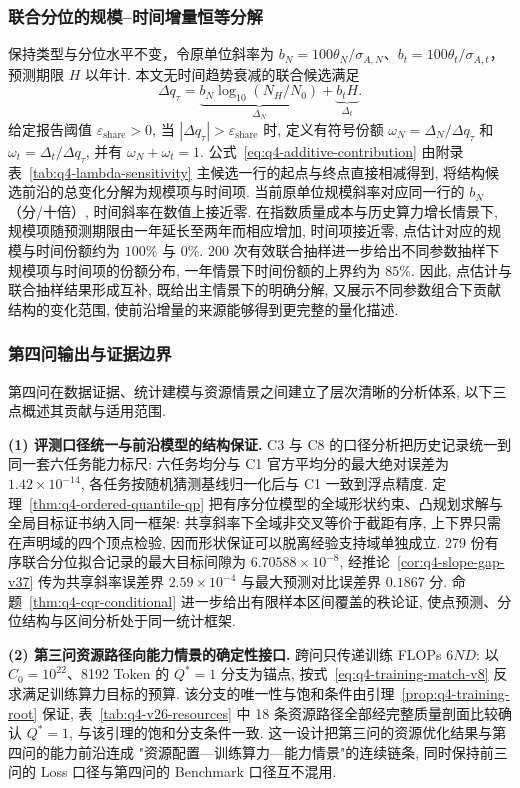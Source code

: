 \subsubsection{联合分位的规模--时间增量恒等分解}
保持类型与分位水平不变，令原单位斜率为 $b_N=100\theta_N/\sigma_{A,N}$、$b_t=100\theta_t/\sigma_{A,t}$，预测期限 $H$ 以年计. 本文无时间趋势衰减的联合候选满足
\begin{equation}\label{eq:q4-additive-contribution}
\Delta q_\tau=
\underbrace{b_N\log_{10}(N_H/N_0)}_{\Delta_N}
+\underbrace{b_tH}_{\Delta_t}.
\end{equation}
给定报告阈值 $\varepsilon_{\mathrm{share}}>0$, 当 $|\Delta q_\tau|>\varepsilon_{\mathrm{share}}$ 时, 定义有符号份额 $\omega_N=\Delta_N/\Delta q_\tau$ 和 $\omega_t=\Delta_t/\Delta q_\tau$, 并有 $\omega_N+\omega_t=1$. 公式~\eqref{eq:q4-additive-contribution} 由附录表~\ref{tab:q4-lambda-sensitivity} 主候选一行的起点与终点直接相减得到, 将结构候选前沿的总变化分解为规模项与时间项. 当前原单位规模斜率对应同一行的 $b_N$（分/十倍）, 时间斜率在数值上接近零. 在指数质量成本与历史算力增长情景下, 规模项随预测期限由一年延长至两年而相应增加, 时间项接近零, 点估计对应的规模与时间份额约为 $100\%$ 与 $0\%$. 200 次有效联合抽样进一步给出不同参数抽样下规模项与时间项的份额分布, 一年情景下时间份额的上界约为 $85\%$. 因此, 点估计与联合抽样结果形成互补, 既给出主情景下的明确分解, 又展示不同参数组合下贡献结构的变化范围, 使前沿增量的来源能够得到更完整的量化描述.

\subsubsection{第四问输出与证据边界}
第四问在数据证据、统计建模与资源情景之间建立了层次清晰的分析体系, 以下三点概述其贡献与适用范围.

\textbf{(1) 评测口径统一与前沿模型的结构保证.} C3 与 C8 的口径分析把历史记录统一到同一套六任务能力标尺: 六任务均分与 C1 官方平均分的最大绝对误差为 $1.42\times10^{-14}$, 各任务按随机猜测基线归一化后与 C1 一致到浮点精度. 定理~\ref{thm:q4-ordered-quantile-qp} 把有序分位模型的全域形状约束、凸规划求解与全局目标证书纳入同一框架: 共享斜率下全域非交叉等价于截距有序, 上下界只需在声明域的四个顶点检验, 因而形状保证可以脱离经验支持域单独成立. 279 份有序联合分位拟合记录的最大目标间隙为 $6.70588\times10^{-8}$, 经推论~\ref{cor:q4-slope-gap-v37} 传为共享斜率误差界 $2.59\times10^{-4}$ 与最大预测对比误差界 $0.1867$ 分. 命题~\ref{thm:q4-cqr-conditional} 进一步给出有限样本区间覆盖的秩论证, 使点预测、分位结构与区间分析处于同一统计框架.

\textbf{(2) 第三问资源路径向能力情景的确定性接口.} 跨问只传递训练 FLOPs $6ND$:
以 $C_0=10^{22}$、8192 Token 的 $Q^*=1$ 分支为锚点, 按式~\eqref{eq:q4-training-match-v8}
反求满足训练算力目标的预算. 该分支的唯一性与饱和条件由引理~\ref{prop:q4-training-root} 保证, 表~\ref{tab:q4-v26-resources} 中 18 条资源路径全部经完整质量剖面比较确认 $Q^*=1$, 与该引理的饱和分支条件一致. 这一设计把第三问的资源优化结果与第四问的能力前沿连成 "资源配置—训练算力—能力情景"的连续链条, 同时保持前三问的 Loss 口径与第四问的 Benchmark 口径互不混用.

